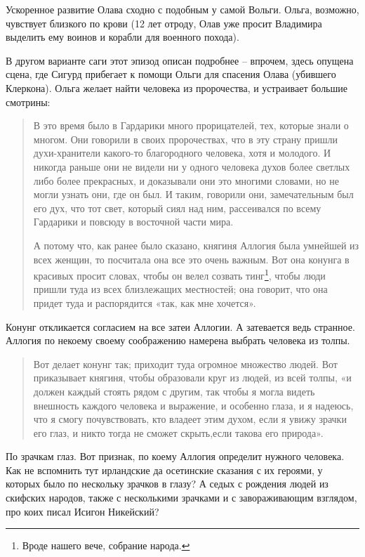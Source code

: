 Ускоренное развитие Олава сходно с подобным у самой Вольги. Ольга, возможно, чувствует близкого по крови (12 лет отроду, Олав уже просит Владимира выделить ему воинов и корабли для военного похода).

В другом варианте саги этот эпизод описан подробнее – впрочем, здесь опущена сцена, где Сигурд прибегает к помощи Ольги для спасения Олава (убившего Клеркона). Ольга желает найти человека из пророчества, и устраивает большие смотрины: 

\begin{quotation}
В это время было в Гардарики много прорицателей, тех, которые знали о многом. Они говорили в своих пророчествах, что в эту страну пришли духи-хранители какого-то благородного человека, хотя и молодого. И никогда раньше они не видели ни у одного человека духов более светлых либо более прекрасных, и доказывали они это многими словами, но не могли узнать они, где он был. И таким, говорили они, замечательным был его дух, что тот свет, который сиял над ним, рассеивался по всему Гардарики и повсюду в восточной части мира. 

А потому что, как ранее было сказано, княгиня Аллогия была умнейшей из всех женщин, то посчитала она все это очень важным. Вот она конунга в красивых просит словах, чтобы он велел созвать тинг\footnote{Вроде нашего вече, собрание народа.}, чтобы люди пришли туда из всех близлежащих местностей; она говорит, что она придет туда и распорядится «так, как мне хочется». 
\end{quotation}

Конунг откликается согласием на все затеи Аллогии. А затевается ведь странное. Аллогия по некоему своему соображению намерена выбрать человека из толпы.

\begin{quotation}
Вот делает конунг так; приходит туда огромное множество людей. Вот приказывает княгиня, чтобы образовали круг из людей, из всей толпы, «и должен каждый стоять рядом с другим, так чтобы я могла видеть внешность каждого человека и выражение, и особенно глаза, и я надеюсь, что я смогу почувствовать, кто владеет этим духом, если я увижу зрачки его глаз, и никто тогда не сможет скрыть,если такова его природа». 
\end{quotation}

По зрачкам глаз. Вот признак, по коему Аллогия определит нужного человека. Как не вспомнить тут ирландские да осетинские сказания с их героями, у которых было по нескольку зрачков в глазу? А седых с рождения людей из скифских народов, также с несколькими зрачками и с завораживающим взглядом, про коих писал Исигон Никейский?

